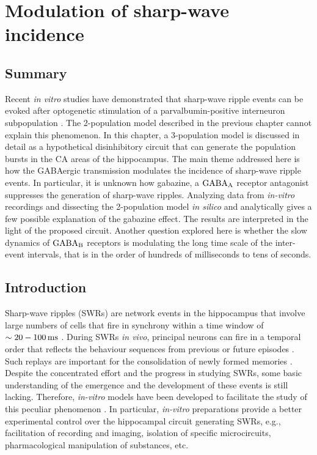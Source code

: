 \chapter{Modulation of sharp-wave incidence}
\label{chap:swr}

\section{Summary}
  Recent \textit{in vitro} studies have demonstrated that sharp-wave ripple
  events can be evoked after optogenetic stimulation of a parvalbumin-positive
  interneuron subpopulation \citep{Schlingloff2014, Kohus2016}. The
  2-population model described in the previous chapter cannot explain this
  phenomenon. In this chapter, a 3-population model is discussed in detail as a
  hypothetical disinhibitory circuit that can generate the population bursts in
  the CA areas of the hippocampus. The main theme addressed here is how the
  GABAergic transmission modulates the incidence of sharp-wave ripple events.
  In particular, it is unknown how gabazine, a $\rm GABA_A$ receptor antagonist
  suppresses the generation of sharp-wave ripples. Analyzing data from
  \textit{in-vitro} recordings and dissecting the 2-population model \textit{in
  silico} and analytically gives a few possible explanation of the gabazine
  effect. The results are interpreted in the light of the proposed circuit.
  Another question explored here is whether the slow dynamics of $\rm GABA_B$
  receptors is modulating the long time scale of the inter-event intervals,
  that is in the order of hundreds of milliseconds to tens of seconds.

\section{Introduction}
  Sharp-wave ripples (SWRs) are network events in the hippocampus that involve
  large numbers of cells that fire in synchrony within a time window of
  $\sim20-100\, \rm ms$ \citep{Buzsaki2015}. During SWRs \textit{in vivo},
  principal neurons can fire in a temporal order that reflects the behaviour
  sequences from previous \citep{Lee2002} or future episodes
  \citep{Dragoi2011}. Such replays are important for the consolidation of newly
  formed memories \citep{Girardeau2009}. Despite the concentrated effort and
  the progress in studying SWRs, some basic understanding of the emergence and
  the development of these events is still lacking. Therefore,
  \textit{in-vitro} models have been developed to facilitate the study of this
  peculiar phenomenon \citep{Maier2003}. In particular, \textit{in-vitro}
  preparations provide a better experimental control over the hippocampal
  circuit generating SWRs, e.g., facilitation of recording and imaging,
  isolation of specific microcircuits, pharmacological manipulation of
  substances, etc.

